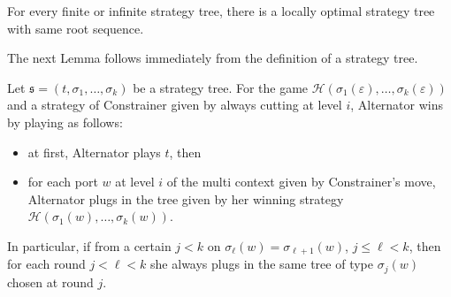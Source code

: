 \begin{lemma}\label{lemma:locallyoptimal}
For every finite or infinite strategy tree, there is a locally optimal strategy tree with same root sequence.
\end{lemma}
 The next Lemma  follows immediately from the definition of a strategy tree.
\begin{lemma}\label{lemma:short_strategy}
Let $\mathfrak{s}=(t, \sigma_1, \dots, \sigma_k)$ be a strategy tree. For the game $\mathcal{H}(\sigma_1(\varepsilon), \dots, \sigma_k(\varepsilon))$ and a strategy of Constrainer given by always cutting at level $i$, Alternator wins  by playing as follows:
\begin{itemize}
\item at first, Alternator plays $t$, then
\item for each port $w$ at level $i$ of the multi context given by Constrainer's move, Alternator plugs in the tree given by her winning strategy $\mathcal{H}(\sigma_1(w), \dots, \sigma_k(w))$.
\end{itemize}
In particular, if from a certain $j<k$ on $\sigma_\ell(w)=\sigma_{\ell+1}(w)$, $j\leq \ell < k$, then for each round $j< \ell < k$ she always plugs in the same tree of type $\sigma_j(w)$ chosen at round $j$.
\end{lemma}






